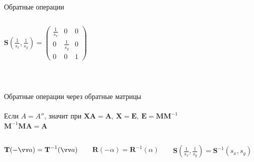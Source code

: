 \documentclass[10pt]{beamer}
\begin{document}
\begin{frame}{Обратные операции}
\begin{columns}[T]
\begin{column}{0.32\textwidth}
     		$
     		\textbf{S}(\frac{1}{s_x},\frac{1}{s_y})=
     		\begin{pmatrix}
     			\frac{1}{s_x}&0&0\\
     			0&\frac{1}{s_y}&0\\
     			0&0&1
     		\end{pmatrix}
     		$
     	\end{column} 
     	
     
     \end{columns}
     
     
     ~ \\ \pause
     
       \centering
       Обратные операции через обратные матрицы \\ ~ \\
       
       Если $A = A''$, значит при $\textbf{X}\textbf{A}=\textbf{A}, \ \textbf{X}=\textbf{E}, \  \textbf{E}=\textbf{M}\textbf{M}^{-1}$  \\ 
        $
       \textbf{M}^{-1}\textbf{M}\textbf{A}=\textbf{A}
       $
        \pause
       
       \begin{columns}[T]
     	\begin{column}{0.29\textwidth}
     		
		$\textbf{T}(-\vv a )=\textbf{T}^{-1}(\vv a)$
			 
     	\end{column}
     	\begin{column}{0.4\textwidth}
		
		$\textbf{R}(-\alpha )=\textbf{R}^{-1}(\alpha)$
		
     	\end{column}
     	\begin{column}{0.32\textwidth}
      
      	$
      		\textbf{S}(\frac{1}{s_x},\frac{1}{s_y})=\textbf{S}^{-1}(s_x,s_y) 
      	$ 
      	

     	\end{column}
     \end{columns}

\end{frame}

	
\end{document}

